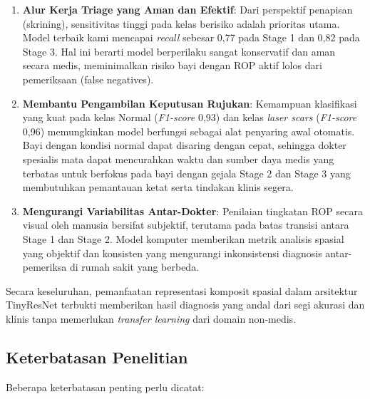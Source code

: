 \begin{enumerate}
    \item \textbf{Alur Kerja Triage yang Aman dan Efektif}: Dari perspektif penapisan (skrining), sensitivitas tinggi pada kelas berisiko adalah prioritas utama. Model terbaik kami mencapai \textit{recall} sebesar 0,77 pada Stage 1 dan 0,82 pada Stage 3. Hal ini berarti model berperilaku sangat konservatif dan aman secara medis, meminimalkan risiko bayi dengan ROP aktif lolos dari pemeriksaan (false negatives).
    \item \textbf{Membantu Pengambilan Keputusan Rujukan}: Kemampuan klasifikasi yang kuat pada kelas Normal (\textit{F1-score} 0,93) dan kelas \textit{laser scars} (\textit{F1-score} 0,96) memungkinkan model berfungsi sebagai alat penyaring awal otomatis. Bayi dengan kondisi normal dapat disaring dengan cepat, sehingga dokter spesialis mata dapat mencurahkan waktu dan sumber daya medis yang terbatas untuk berfokus pada bayi dengan gejala Stage 2 dan Stage 3 yang membutuhkan pemantauan ketat serta tindakan klinis segera.
    \item \textbf{Mengurangi Variabilitas Antar-Dokter}: Penilaian tingkatan ROP secara visual oleh manusia bersifat subjektif, terutama pada batas transisi antara Stage 1 dan Stage 2. Model komputer memberikan metrik analisis spasial yang objektif dan konsisten yang mengurangi inkonsistensi diagnosis antar-pemeriksa di rumah sakit yang berbeda.
\end{enumerate}
Secara keseluruhan, pemanfaatan representasi komposit spasial dalam arsitektur TinyResNet terbukti memberikan hasil diagnosis yang andal dari segi akurasi dan klinis tanpa memerlukan \textit{transfer learning} dari domain non-medis.

\subsection{Keterbatasan Penelitian}

Beberapa keterbatasan penting perlu dicatat:

